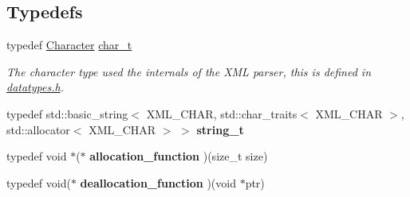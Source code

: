 \subsection*{Typedefs}
\begin{DoxyCompactItemize}
\item 
\hypertarget{namespacephys_1_1xml_afc87705cd1c2917d87b879715a2d8f6e}{
typedef \hyperlink{namespacephys_a3098bae5b0a3cd16eec331f766cc562b}{Character} \hyperlink{namespacephys_1_1xml_afc87705cd1c2917d87b879715a2d8f6e}{char\_\-t}}
\label{d9/d27/namespacephys_1_1xml_afc87705cd1c2917d87b879715a2d8f6e}

\begin{DoxyCompactList}\small\item\em The character type used the internals of the XML parser, this is defined in \hyperlink{datatypes_8h_source}{datatypes.h}. \item\end{DoxyCompactList}\item 
\hypertarget{namespacephys_1_1xml_ad721463bf480c1c4e80d423b28eff231}{
typedef std::basic\_\-string$<$ XML\_\-CHAR, std::char\_\-traits$<$ XML\_\-CHAR $>$, std::allocator$<$ XML\_\-CHAR $>$ $>$ {\bfseries string\_\-t}}
\label{d9/d27/namespacephys_1_1xml_ad721463bf480c1c4e80d423b28eff231}

\item 
\hypertarget{namespacephys_1_1xml_a3012ecdd41040d1471217fdac32c76ca}{
typedef void $\ast$($\ast$ {\bfseries allocation\_\-function} )(size\_\-t size)}
\label{d9/d27/namespacephys_1_1xml_a3012ecdd41040d1471217fdac32c76ca}

\item 
\hypertarget{namespacephys_1_1xml_a042e00af30d526d7d17bc4aaa3e7c592}{
typedef void($\ast$ {\bfseries deallocation\_\-function} )(void $\ast$ptr)}
\label{d9/d27/namespacephys_1_1xml_a042e00af30d526d7d17bc4aaa3e7c592}

\end{DoxyCompactItemize}
